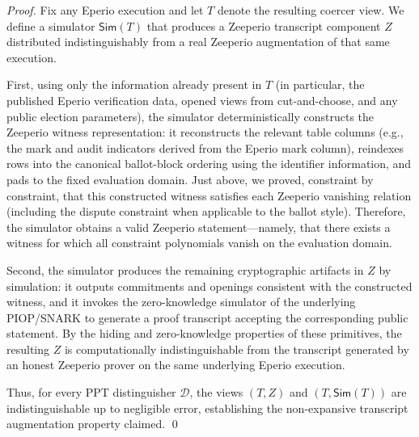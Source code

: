 \begin{proof}
Fix any Eperio execution and let $T$ denote the resulting coercer view. We define a simulator $\mathsf{Sim}(T)$ that
produces a Zeeperio transcript component $Z$ distributed indistinguishably from a real Zeeperio augmentation of that same
execution.

First, using only the information already present in $T$ (in particular, the published Eperio verification data, opened
views from cut-and-choose, and any public election parameters), the simulator deterministically constructs the Zeeperio
witness representation: it reconstructs the relevant table columns (e.g., the mark and audit indicators derived from the
Eperio mark column), reindexes rows into the canonical ballot-block ordering using the identifier information, and pads
to the fixed evaluation domain. Just above, we proved, constraint by constraint, that this
constructed witness satisfies each Zeeperio vanishing relation (including the dispute constraint when applicable to the
ballot style). Therefore, the simulator obtains a valid Zeeperio statement---namely, that there exists a witness for
which all constraint polynomials vanish on the evaluation domain.

Second, the simulator produces the remaining cryptographic artifacts in $Z$ by simulation: it outputs commitments and
openings consistent with the constructed witness, and it invokes the zero-knowledge simulator of the underlying
PIOP/SNARK to generate a proof transcript accepting the corresponding public statement. By the hiding and
zero-knowledge properties of these primitives, the resulting $Z$ is computationally indistinguishable from the transcript
generated by an honest Zeeperio prover on the same underlying Eperio execution.

Thus, for every PPT distinguisher $\mathcal{D}$, the views $(T,Z)$ and $(T,\mathsf{Sim}(T))$ are indistinguishable up to
negligible error, establishing the non-expansive transcript augmentation property claimed. \qed
\end{proof} 